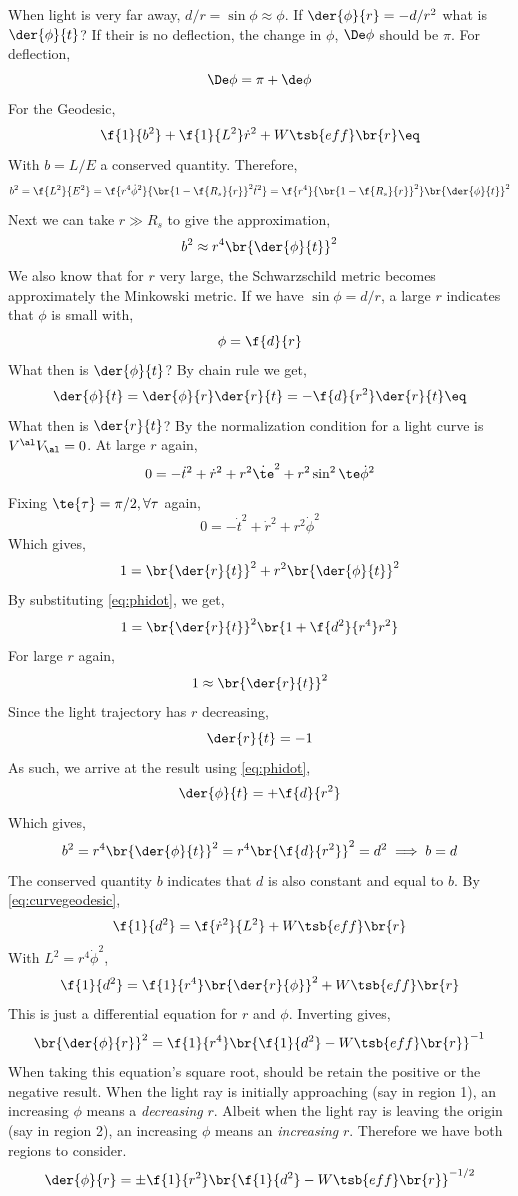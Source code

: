 \documentclass{article}
\begin{document}
When light is very far away, $d/r = \sin \phi \approx \phi$. If $\der{\phi}{r} = - d/r^2$ what is $\der{\phi}{t}$? If their is no deflection, the change in $\phi$, $\De \phi$ should be $\pi$. For deflection,
\[ \De \phi = \pi + \de \phi \]
For the Geodesic,
\[ \f{1}{b^2} + \f{1}{L^2} \dot{r}^2  + W\tsb{eff}\br{r} \eq \label{eq:curvegeodesic}\]
With $b = L / E$ a conserved quantity. Therefore,
\[ b^2 = \f{L^2}{E^2} = \f{r^4 \dot{\phi}^2}{\br{1-\f{R_s}{r}}^2 \dot{t}^2} = \f{r^4}{\br{1-\f{R_s}{r}}^2} \br{\der{\phi}{t}}^2 \]
Next we can take $r \gg R_s$ to give the approximation,
\[b^2 \approx r^4 \br{\der{\phi}{t}}^2\]
We also know that for $r$ very large, the Schwarzschild metric becomes approximately the Minkowski metric. If we have $\sin \phi = d/r$, a large $r$ indicates that $\phi$ is small with,
\[ \phi = \f{d}{r} \]
What then is $\der{\phi}{t}$? By chain rule we get,
\[ \der{\phi}{t} = \der{\phi}{r} \der{r}{t}  = - \f{d}{r^2} \der{r}{t} \eq \label{eq:phidot}\]
What then is $\der{r}{t}$? By the normalization condition for a light curve is $V^\al V_\al = 0$. At large $r$ again,
\[ 0 = -\dot{t}^2 + \dot{r}^2 + r^2 \dot{\te}^2  + r^2 \sin^2 \te \dot{\phi}^2\]
Fixing $\te{\tau} = \pi /2,  \forall \tau$ again,
\[ 0 = -\dot{t}^2 + \dot{r}^2 + r^2 \dot{\phi}^2\]
Which gives,
\[ 1 = \br{\der{r}{t}}^2 + r^2 \br{\der{\phi}{t}}^2 \]
By substituting \eqref{eq:phidot}, we get,
\[ 1 = \br{\der{r}{t}}^2 \br{1 + \f{d^2}{r^4} r^2} \]
For large $r$ again,
\[ 1 \approx \br{\der{r}{t}}^2 \]
Since the light trajectory has $r$ decreasing,
\[ \der{r}{t} = -1 \]
As such, we arrive at the result using \eqref{eq:phidot},
\[ \der{\phi}{t} = +\f{d}{r^2} \]
Which gives,
\[ b^2 = r^4 \br{\der{\phi}{t}}^2 = r^4 \br{\f{d}{r^2}}^2 = d^2 \implies b = d \]
The conserved quantity $b$ indicates that $d$ is also constant and equal to $b$. By \eqref{eq:curvegeodesic},
\[ \f{1}{d^2} = \f{\dot{r}^2}{L^2} + W\tsb{eff}\br{r} \]
With $L^2 = r^4 \dot{\phi}^2$,
\[ \f{1}{d^2} = \f{1}{r^4}\br{\der{r}{\phi}}^2 + W\tsb{eff}\br{r} \]
This is just a differential equation for $r$ and $\phi$. Inverting gives,
\[ \br{\der{\phi}{r}}^2 = \f{1}{r^4} \br{\f{1}{d^2} - W\tsb{eff}\br{r}}^{-1} \]
When taking this equation's square root, should be retain the positive or the negative result. When the light ray is initially approaching (say in region 1), an increasing $\phi$ means a \textit{decreasing} $r$. Albeit when the light ray is leaving the origin (say in region 2), an increasing $\phi$ means an \textit{increasing} $r$. Therefore we have both regions to consider.
\[ \der{\phi}{r} = \pm \f{1}{r^2} \br{\f{1}{d^2} - W\tsb{eff}\br{r}}^{-1/2} \]
\end{document}
